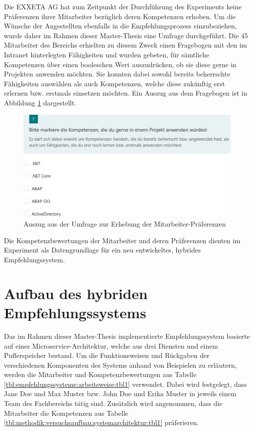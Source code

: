 Die EXXETA AG hat zum Zeitpunkt der Durchführung des Experiments keine Präferenzen ihrer Mitarbeiter bezüglich deren Kompetenzen erhoben. Um die Wünsche der Angestellten ebenfalls in die Empfehlungsprozess einzubeziehen, wurde daher im Rahmen dieser Master-Thesis eine Umfrage durchgeführt. Die 45 Mitarbeiter des Bereichs \JES erhielten zu diesem Zweck einen Fragebogen mit den \anzFaehigkeiten im Intranet hinterlegten Fähigkeiten und wurden gebeten, für sämtliche Kompetenzen über einen booleschen Wert auszudrücken, ob sie diese gerne in Projekten anwenden möchten. Sie konnten dabei sowohl bereits beherrschte Fähigkeiten auswählen als auch Kompetenzen, welche diese zukünftig erst erlernen bzw. erstmals einsetzen möchten. Ein Auszug aus dem Fragebogen ist in Abbildung \ref{fig:methodik:versuchsaufbau:abb1} dargestellt.

\begin{figure}[h]
	\centering
	\includegraphics[width=1\textwidth]{gfx/Umfage_Faehigkeiten.png}
	\caption{Auszug aus der Umfrage zur Erhebung der Mitarbeiter-Präferenzen}
	\label{fig:methodik:versuchsaufbau:abb1}
\end{figure}

Die Kompetenzbewertungen der Mitarbeiter und deren Präferenzen dienten im Experiment als Datengrundlage für ein neu entwickeltes, hybrides Empfehlungssystem.

\section{Aufbau des hybriden Empfehlungssystems}
\label{ch:methodik:versuchsaufbau:systemarchitektur}
Das im Rahmen dieser Master-Thesis implementierte Empfehlungssystem basierte auf einer Microservice-Architektur, welche aus drei Diensten und einem Pufferspeicher bestand. Um die Funktionsweisen und Rückgaben der verschiedenen Komponenten des Systems anhand von Beispielen zu erläutern, werden die Mitarbeiter und Kompetenzbewertungen aus Tabelle \ref{tbl:empfehlungssysteme:arbeitsweise:tbl1} verwendet. Dabei wird festgelegt, dass Jane Doe und Max Muster bzw. John Doe und Erika Muster in jeweils einem Team des Fachbereichs \JES tätig sind. Zusätzlich wird angenommen, dass die Mitarbeiter die Kompetenzen aus Tabelle \ref{tbl:methodik:versuchsaufbau:systemarchitektur:tbl1} präferieren.

